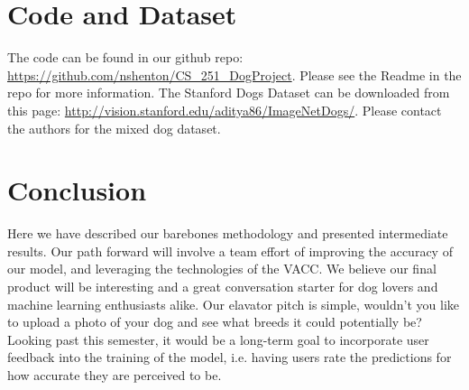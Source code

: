 \documentclass[12pt]{article}
\begin{document}

\section{Code and Dataset}

The code can be found in our github repo: \url{https://github.com/nshenton/CS_251_DogProject}. Please see the Readme in the repo for more information. The Stanford Dogs Dataset can be downloaded from this page: \url{http://vision.stanford.edu/aditya86/ImageNetDogs/}. Please contact the authors for the mixed dog dataset.

\section{Conclusion}

Here we have described our barebones methodology and presented intermediate results. Our path forward will involve a team effort of improving the accuracy of our model, and leveraging the technologies of the VACC. We believe our final product will be interesting and a great conversation starter for dog lovers and machine learning enthusiasts alike. Our elavator pitch is simple, wouldn't you like to upload a photo of your dog and see what breeds it could potentially be? Looking past this semester, it would be a long-term goal to incorporate user feedback into the training of the model, i.e. having users rate the predictions for how accurate they are perceived to be. 

\nocite{*}
{}

\end{document}
